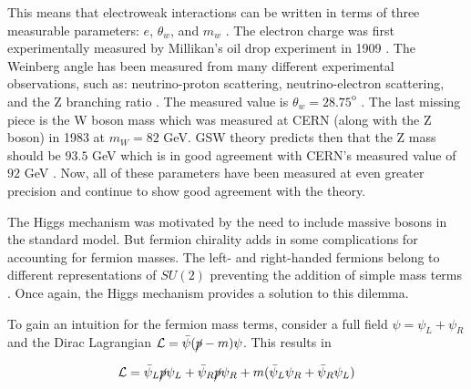This means that electroweak interactions can be written in terms of three measurable parameters: $e$, $\theta_{w}$, and $m_{w}$ \cite{Peskin}. The electron charge was first experimentally measured by Millikan's oil drop experiment in 1909 \cite{OilDrop}. The Weinberg angle has been measured from many different experimental observations, such as: neutrino-proton scattering, neutrino-electron scattering, and the Z branching ratio \cite{Peskin}. The measured value is $\theta_{w}=28.75^{\textrm{o}}$ \cite{Griffiths}. The last missing piece is the W boson mass which was measured at CERN (along with the Z boson) in 1983 at $m_{W}=82$ GeV. GSW theory predicts then that the Z mass should be $93.5$ GeV which is in good agreement with CERN's measured value of $92$ GeV \cite{Griffiths, WBoson, ZBoson}. Now, all of these parameters have been measured at even greater precision and continue to show good agreement with the theory.

\;


The Higgs mechanism was motivated by the need to include massive bosons in the standard model. But fermion chirality adds in some complications for accounting for fermion masses. The left- and right-handed fermions belong to different representations of $SU(2)$ preventing the addition of simple mass terms \cite{Peskin}. Once again, the Higgs mechanism provides a solution to this dilemma.

To gain an intuition for the fermion mass terms, consider a full field $\psi=\psi_{L}+\psi_{R}$ and the Dirac Lagrangian $\mathcal{L}=\bar{\psi}(\cancel{p}-m)\psi$. This results in

\begin{equation}
    \mathcal{L}=\bar{\psi}_{L}\cancel{p}\psi_{L} + \bar{\psi}_{R}\cancel{p}\psi_{R} + m(\bar{\psi}_{L}\psi_{R} + \bar{\psi}_{R}\psi_{L})
\end{equation}

